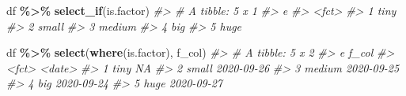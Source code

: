 \documentclass[
]{report}
\newenvironment{Shaded}{\begin{snugshade}}{\end{snugshade}}
\newcommand{\CommentTok}[1]{\textcolor[rgb]{0.56,0.35,0.01}{\textit{#1}}}
\newcommand{\KeywordTok}[1]{\textcolor[rgb]{0.13,0.29,0.53}{\textbf{#1}}}
\newcommand{\NormalTok}[1]{#1}
\newcommand{\OperatorTok}[1]{\textcolor[rgb]{0.81,0.36,0.00}{\textbf{#1}}}
\newcommand{\StringTok}[1]{\textcolor[rgb]{0.31,0.60,0.02}{#1}}
\begin{document}
\begin{Shaded}
\begin{Highlighting}[]
\NormalTok{df }\OperatorTok{\%\textgreater{}\%}
\StringTok{  }\KeywordTok{select\_if}\NormalTok{(is.factor)}
\CommentTok{\#\textgreater{} \# A tibble: 5 x 1}
\CommentTok{\#\textgreater{}   e     }
\CommentTok{\#\textgreater{}   \textless{}fct\textgreater{} }
\CommentTok{\#\textgreater{} 1 tiny  }
\CommentTok{\#\textgreater{} 2 small }
\CommentTok{\#\textgreater{} 3 medium}
\CommentTok{\#\textgreater{} 4 big   }
\CommentTok{\#\textgreater{} 5 huge}
\end{Highlighting}
\end{Shaded}

\begin{Shaded}
\begin{Highlighting}[]
\NormalTok{df }\OperatorTok{\%\textgreater{}\%}
\StringTok{  }\KeywordTok{select}\NormalTok{(}\KeywordTok{where}\NormalTok{(is.factor), f\_col)}
\CommentTok{\#\textgreater{} \# A tibble: 5 x 2}
\CommentTok{\#\textgreater{}   e      f\_col     }
\CommentTok{\#\textgreater{}   \textless{}fct\textgreater{}  \textless{}date\textgreater{}    }
\CommentTok{\#\textgreater{} 1 tiny   NA        }
\CommentTok{\#\textgreater{} 2 small  2020{-}09{-}26}
\CommentTok{\#\textgreater{} 3 medium 2020{-}09{-}25}
\CommentTok{\#\textgreater{} 4 big    2020{-}09{-}24}
\CommentTok{\#\textgreater{} 5 huge   2020{-}09{-}27}
\end{Highlighting}
\end{Shaded}
\end{document}
